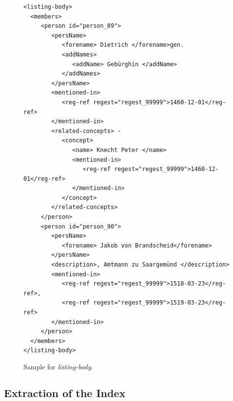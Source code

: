 \begin{figure}[h]
\begin{verbatim}
<listing-body>
  <members>
     <person id="person_89">
        <persName>
           <forename> Dietrich </forename>gen.
           <addNames>
              <addName> Gebürghin </addName>
           </addNames>
        </persName>
        <mentioned-in>
           <reg-ref regest="regest_99999">1460-12-01</reg-ref>
        </mentioned-in>
        <related-concepts> -
           <concept>
              <name> Knecht Peter </name>
              <mentioned-in>
                 <reg-ref regest="regest_99999">1460-12-01</reg-ref>
              </mentioned-in>
           </concept>
        </related-concepts>
     </person>
     <person id="person_90">
        <persName>
           <forename> Jakob von Brandscheid</forename>
        </persName>
        <description>, Amtmann zu Saargemünd </description>
        <mentioned-in>
           <reg-ref regest="regest_99999">1518-03-23</reg-ref>, 
           <reg-ref regest="regest_99999">1519-03-23</reg-ref>
        </mentioned-in>
     </person>
  </members>
</listing-body>
\end{verbatim}
\label{fig:listing-body-xml}
\caption{Sample for \textit{listing-body}.}
\end{figure}



\subsection{Extraction of the Index}


